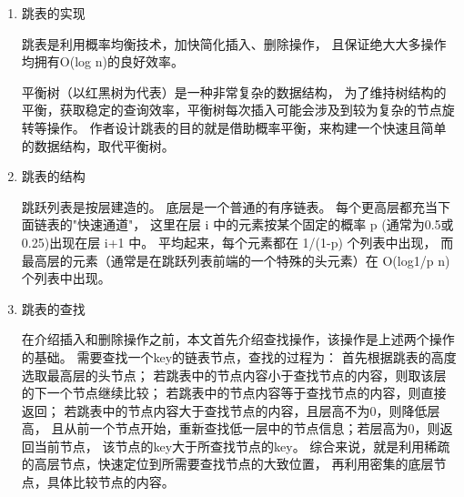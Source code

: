		\begin{enumerate}
		\item 跳表的实现
		

		跳表是利用概率均衡技术，加快简化插入、删除操作，
		且保证绝大大多操作均拥有O(log n)的良好效率。
		


		平衡树（以红黑树为代表）是一种非常复杂的数据结构，
		为了维持树结构的平衡，获取稳定的查询效率，平衡树每次插入可能会涉及到较为复杂的节点旋转等操作。
		作者设计跳表的目的就是借助概率平衡，来构建一个快速且简单的数据结构，取代平衡树。



		\item 跳表的结构
		

		跳跃列表是按层建造的。
		底层是一个普通的有序链表。
		每个更高层都充当下面链表的"快速通道"，
		这里在层 i 中的元素按某个固定的概率 p (通常为0.5或0.25)出现在层 i+1 中。
		平均起来，每个元素都在 1/(1-p) 个列表中出现，
		而最高层的元素（通常是在跳跃列表前端的一个特殊的头元素）在 O(log1/p n) 个列表中出现。

		\item 跳表的查找
		
		
		在介绍插入和删除操作之前，本文首先介绍查找操作，该操作是上述两个操作的基础。
需要查找一个key的链表节点，查找的过程为：
首先根据跳表的高度选取最高层的头节点；
若跳表中的节点内容小于查找节点的内容，则取该层的下一个节点继续比较；
若跳表中的节点内容等于查找节点的内容，则直接返回；
若跳表中的节点内容大于查找节点的内容，且层高不为0，则降低层高，
且从前一个节点开始，重新查找低一层中的节点信息；若层高为0，则返回当前节点，
该节点的key大于所查找节点的key。
综合来说，就是利用稀疏的高层节点，快速定位到所需要查找节点的大致位置，
再利用密集的底层节点，具体比较节点的内容。
		


\end{enumerate}
